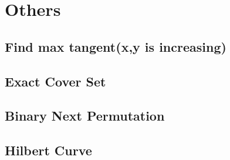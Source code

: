 \documentclass[a4paper,10pt,twocolumn,oneside]{article}
\begin{document}
\section{Others}

\subsection{Find max tangent(x,y is increasing)}


\subsection{Exact Cover Set}


%

\subsection{Binary Next Permutation}


\subsection{Hilbert Curve}


%
\end{document}
